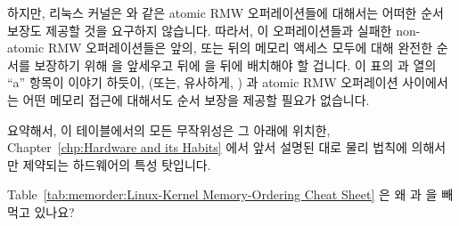 {	하지만, 리눅스 커널은  와 같은  atomic RMW
	오퍼레이션들에 대해서는 어떠한 순서 보장도 제공할 것을 요구하지
	않습니다.
	따라서, 이 오퍼레이션들과 실패한 non- atomic RMW
	오퍼레이션들은 앞의, 또는 뒤의 메모리 액세스 모두에 대해 완전한 순서를
	보장하기 위해  을 앞세우고 뒤에
	 을 뒤에 배치해야 할 겁니다.
	이 표의  과 
	열의 ``a'' 항목이 이야기 하듯이,  (또는,
	유사하게, ) 과 atomic RMW 오퍼레이션
	사이에서는 어떤 메모리 접근에 대해서도 순서 보장을 제공할 필요가
	없습니다.

	요약해서, 이 테이블에서의 모든 무작위성은 그 아래에 위치한,
	Chapter~\ref{chp:Hardware and its Habits} 에서 앞서 설명된 대로 물리
	법칙에 의해서만 제약되는 하드웨어의 특성 탓입니다.

} \QuickQuizEnd

\QuickQuiz{}
	Table~\ref{tab:memorder:Linux-Kernel Memory-Ordering Cheat Sheet}
	은 왜  과 
	을 빼먹고 있나요?
	\iffalse

